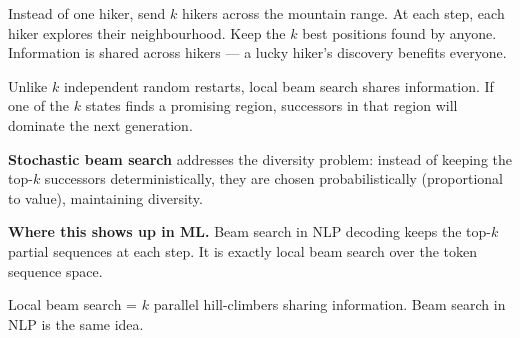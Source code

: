 \documentclass[a4paper,11pt]{article}
\begin{document}
\begin{intuition}
Instead of one hiker, send $k$ hikers across the mountain range. At each step, each hiker explores their neighbourhood. Keep the $k$ best positions found by anyone. Information is shared across hikers — a lucky hiker's discovery benefits everyone.
\end{intuition}

Unlike $k$ independent random restarts, local beam search shares information. If one of the $k$ states finds a promising region, successors in that region will dominate the next generation.

\textbf{Stochastic beam search} addresses the diversity problem: instead of keeping the top-$k$ successors deterministically, they are chosen probabilistically (proportional to value), maintaining diversity.

\textbf{Where this shows up in ML.} Beam search in NLP decoding keeps the top-$k$ partial sequences at each step. It is exactly local beam search over the token sequence space.

\begin{keytake}
Local beam search = $k$ parallel hill-climbers sharing information. Beam search in NLP is the same idea.
\end{keytake}
\end{document}
